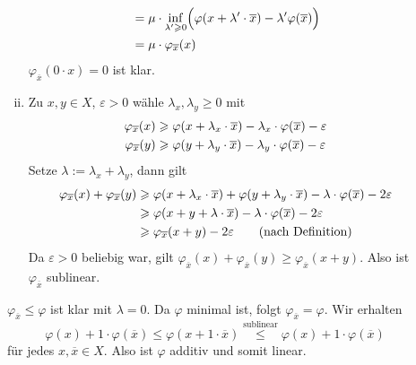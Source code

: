 \begin{description}
\begin{enumerate}[(i)]
\begin{align*}
			&= \mu \cdot \inf_{\lambda' \ge 0} \enbrace[\Big]{ \varphi \enbrace*{x+ \lambda' \cdot \overline{x} } - \lambda' \varphi(\overline{x})} \\
			&= \mu \cdot \varphi_{\overline{x}}(x) 
		\end{align*}
		$\varphi_{\overline{x}}(0 \cdot x) = 0$ ist klar.
		\item Zu $x,y \in X$, $\varepsilon>0$ wähle $\lambda_x, \lambda_y \ge 0$ mit 
		\begin{align*}
			\varphi_{\overline{x}}(x) &\ge \varphi \enbrace*{x + \lambda_x \cdot \overline{x}} - \lambda_x \cdot \varphi(\overline{x}) - \varepsilon \\
			\varphi_{\overline{x}}(y) &\ge \varphi \enbrace*{y + \lambda_y \cdot \overline{x}} - \lambda_y \cdot \varphi(\overline{x}) - \varepsilon 
		\end{align*}
		Setze $\lambda  := \lambda_x + \lambda_y$, dann gilt
		\begin{align*}
			\varphi_{\overline{x}}(x) + \varphi_{\overline{x}}(y) &\ge \varphi \enbrace*{ x+ \lambda_x \cdot \overline{x}} + 
			\varphi \enbrace*{y+ \lambda_y \cdot \overline{x} } - \lambda  \cdot \varphi(\overline{x}) - 2 \varepsilon \\
			&\ge  \varphi \enbrace*{x +y + \lambda \cdot \overline{x}} - \lambda  \cdot \varphi(\overline{x}) - 2 \varepsilon \\
			&\ge \varphi_{\overline{x}} (x+y) - 2 \varepsilon \tag*{(nach Definition)}
		\end{align*}
		Da $\varepsilon>0$ beliebig war, gilt $\varphi_{\overline{x}}(x) + \varphi_{\overline{x}}(y) \ge \varphi_{\overline{x}}(x+y)$. Also ist $\varphi_{\overline{x}}$
		sublinear.
	\end{enumerate}
	$\varphi_{\overline{x}} \le \varphi$ ist klar mit $\lambda=0$. Da $\varphi$ minimal ist, folgt $\varphi_{\overline{x}} = \varphi$. Wir erhalten 
	\[
		\varphi(x) + 1 \cdot \varphi(\overline{x}) \le \varphi(x+ 1 \cdot \overline{x}) \stackrel{\text{sublinear}}{\le} \varphi(x) + 1 \cdot \varphi(\overline{x})
	\]
	für jedes $x, \overline{x}\in X$. Also ist $\varphi$ additiv und somit linear. \bewende
\end{description}

